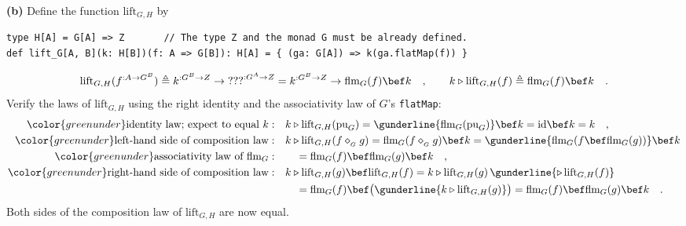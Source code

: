 \textbf{(b)} Define the function $\text{lift}_{G,H}$ by
\begin{lstlisting}
type H[A] = G[A] => Z       // The type Z and the monad G must be already defined.
def lift_G[A, B](k: H[B])(f: A => G[B]): H[A] = { (ga: G[A]) => k(ga.flatMap(f)) }
\end{lstlisting}
\[
\text{lift}_{G,H}(f^{:A\rightarrow G^{B}})\triangleq k^{:G^{B}\rightarrow Z}\rightarrow\text{???}^{:G^{A}\rightarrow Z}=k^{:G^{B}\rightarrow Z}\rightarrow\text{flm}_{G}(f)\bef k\quad,\quad\quad k\triangleright\text{lift}_{G,H}(f)\triangleq\text{flm}_{G}(f)\bef k\quad.
\]
Verify the laws of $\text{lift}_{G,H}$ using the right identity and
the associativity law of $G$\textsf{'}s \lstinline!flatMap!:
\begin{align*}
{\color{greenunder}\text{identity law; expect to equal }k:}\quad & k\triangleright\text{lift}_{G,H}(\text{pu}_{G})=\gunderline{\text{flm}_{G}(\text{pu}_{G})}\bef k=\text{id}\bef k=k\quad,\\
{\color{greenunder}\text{left-hand side of composition law}:}\quad & k\triangleright\text{lift}_{G,H}(f\diamond_{_{G}}g)=\text{flm}_{G}(f\diamond_{_{G}}g)\bef k=\gunderline{\text{flm}_{G}(f\bef\text{flm}_{G}(g))}\bef k\\
{\color{greenunder}\text{associativity law of }\text{flm}_{G}:}\quad & \quad=\text{flm}_{G}(f)\bef\text{flm}_{G}(g)\bef k\quad,\\
{\color{greenunder}\text{right-hand side of composition law}:}\quad & k\triangleright\text{lift}_{G,H}(g)\bef\text{lift}_{G,H}(f)=k\triangleright\text{lift}_{G,H}(g)\,\gunderline{\triangleright\,\text{lift}_{G,H}(f)}\\
 & \quad=\text{flm}_{G}(f)\bef\big(\gunderline{k\triangleright\text{lift}_{G,H}(g)}\big)=\text{flm}_{G}(f)\bef\text{flm}_{G}(g)\bef k\quad.
\end{align*}
Both sides of the composition law of $\text{lift}_{G,H}$ are now
equal.

